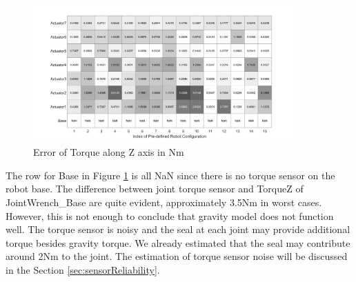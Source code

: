 \begin{figure}[H]
	\begin{center}
		\includegraphics[width=0.9\textwidth]{./images/SensorErrortoBaseJointWrench.png}%
		\caption{Error of Torque along Z axis in Nm}
		\label{fig:SensorErrortoBaseJointWrench}%
	\end{center}
\end{figure}

The row for Base in Figure \ref{fig:SensorErrortoBaseJointWrench} is all NaN since there is no torque sensor on the robot base. The difference between joint torque sensor and  TorqueZ of JointWrench\_Base are quite evident, approximately 3.5Nm in worst cases. However, this is not enough to conclude that gravity model does not function well. The torque sensor is noisy and the seal at each joint may provide additional torque besides gravity torque. We already estimated that the seal may contribute around 2Nm to the joint. The estimation of torque sensor noise will be discussed in the Section \ref{sec:sensorReliability}.
